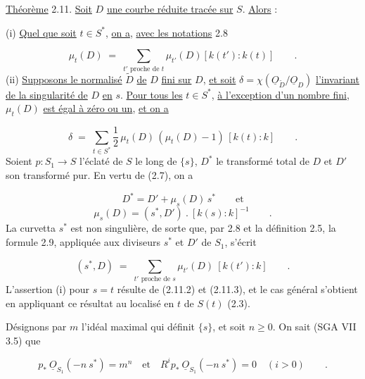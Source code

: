 \underline{Théorème} 2.11. \underline{Soit} $D$ \underline{une courbe réduite tracée sur} $S$. \underline{Alors} :

(i) \underline{Quel que soit} $t \in S^*$, \underline{on a}, \underline{avec les notations} 2.8

\begin{equation*}
\mu_t(D) \;=\; \sum_{t' \text{ proche de } t} \mu_{t'}(D)[k(t'):k(t)] \qquad .
\end{equation*}
(ii) \underline{Supposons le normalisé} $\widetilde{D}$ \underline{de} $D$ \underline{fini sur} $D$, \underline{et soit} $\delta = \chi(\underline{O}_{\widetilde{D}}/\underline{O}_D)$ \underline{l'invariant de la singularité de} $D$ \underline{en} $s$. \underline{Pour tous les} $t \in S^*$, \underline{à l'exception d'un nombre fini}, $\mu_t(D)$ \underline{est égal à zéro ou un}, \underline{et on a}

\begin{equation*}
\delta \;=\; \sum_{t \in S^*} \frac{1}{2}\,\mu_t(D)\,(\mu_t(D)-1)\,[k(t):k] \qquad .
\end{equation*}
Soient $p : S_1 \longrightarrow S$ l'éclaté de $S$ le long de $\{s\}$, $D^*$ le transformé total de $D$ et $D'$ son transformé pur. En vertu de (2.7), on a

\begin{equation}\tag{2.11.1}
D^* = D' + \mu_s(D)\, s^* \qquad \text{et}
\end{equation}
\begin{equation}\tag{2.11.2}
\mu_s(D) = (s^*,D')\ .\ [k(s):k]^{-1} \qquad .
\end{equation}
La curvetta $s^*$ est non singulière, de sorte que, par 2.8 et la définition 2.5, la formule 2.9, appliquée aux diviseurs $s^*$ et $D'$ de $S_1$, s'écrit

\begin{equation}\tag{2.11.3}
(s^*,D) \;=\; \sum_{t' \text{ proche de } s} \mu_{t'}(D)\ [k(t'):k] \qquad .
\end{equation}
L'assertion (i) pour $s = t$ résulte de (2.11.2) et (2.11.3), et le cas général s'obtient en appliquant ce résultat au localisé en $t$ de $S(t)$ (2.3).

Désignons par $m$ l'idéal maximal qui définit $\{s\}$, et soit $n \geq 0$. On sait (SGA VII 3.5) que

\begin{equation}\tag{2.11.4}
p_*\ \underline{O}_{S_1}(-n\ s^*) = m^n \quad \text{et} \quad R^i p_*\ \underline{O}_{S_1}(-n\ s^*) = 0 \quad (i > 0) \qquad .
\end{equation}

